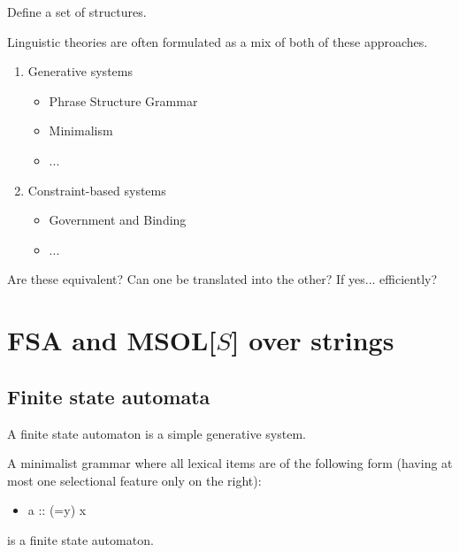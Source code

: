 \documentclass{beamer}
\begin{document}
\begin{frame}


Define a set of structures.

\pause
Linguistic theories are often formulated as a mix of both of these approaches.

\pause
\begin{enumerate}
\item Generative systems
	\begin{itemize}
	\item Phrase Structure Grammar
	\item Minimalism
	\item ...
	\end{itemize}
\item Constraint-based systems
	\begin{itemize}
	\item Government and Binding
	\item ...
	\end{itemize}
\end{enumerate}
\pause Are these equivalent? Can one be translated into the other?
\pause If yes... efficiently?
\end{frame}

\section{FSA and MSOL[$S$] over strings}%

\subsection{Finite state automata}

\begin{frame}
A finite state automaton is a simple generative system.

\pause

A minimalist grammar where all lexical items are of the following form (having at most one selectional feature only on the right):

\begin{itemize}
\item a :: (=y) x
\end{itemize}

is a finite state automaton.

\end{frame}
\end{document}
